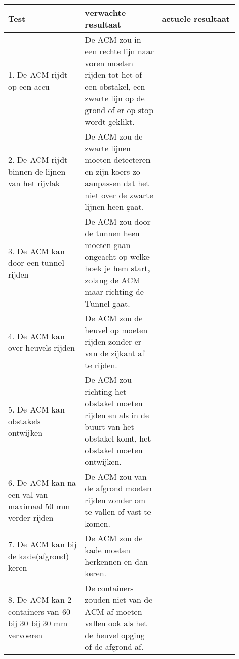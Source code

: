 \begin{center}
    \begin{tabular}{p{0.3\linewidth} p{0.3\linewidth} p{0.3\linewidth}}
        \hline
        \textbf{Test}                                                & \textbf{verwachte resultaat}                                                                                                             & \textbf{actuele resultaat} \\
        \hline
        \hline
        1. De ACM rijdt op een accu                                  & De ACM zou in een rechte lijn naar voren moeten rijden tot het of een obstakel, een zwarte lijn op de grond of er op stop wordt geklikt. &                            \\
        \hline
        2. De ACM rijdt binnen de lijnen van het rijvlak             & De ACM zou de zwarte lijnen moeten detecteren en zijn koers zo aanpassen dat het niet over de zwarte lijnen heen gaat.                   &                            \\
        \hline
        3. De ACM kan door een tunnel rijden                         & De ACM zou door de tunnen heen moeten gaan ongeacht op welke hoek je hem start, zolang de ACM maar richting de Tunnel gaat.              &                            \\
        \hline
        4. De ACM kan over heuvels rijden                            & De ACM zou de heuvel op moeten rijden zonder er van de zijkant af te rijden.                                                             &                            \\
        \hline
        5. De ACM kan obstakels ontwijken                            & De ACM zou richting het obstakel moeten rijden en als in de buurt van het obstakel komt, het obstakel moeten ontwijken.                  &                            \\
        \hline
        6. De ACM kan na een val van maximaal 50 mm verder rijden    & De ACM zou van de afgrond moeten rijden zonder om te vallen of vast te komen.                                                            &                            \\
        \hline
        7. De ACM kan bij de kade(afgrond) keren                     & De ACM zou de kade moeten herkennen en dan keren.                                                                                        &                            \\
        \hline
        8. De ACM kan 2 containers van 60 bij 30 bij 30 mm vervoeren & De containers zouden niet van de ACM af moeten vallen ook als het de heuvel opging of de afgrond af.                                     &                            \\

\end{tabular}
\end{center}
